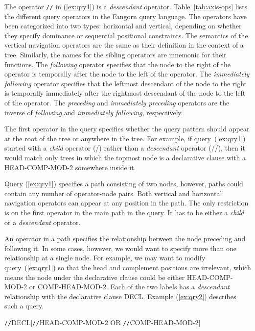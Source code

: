 The operator \verb=//= in (\ref{ex:qry1}) is a \emph{descendant} operator. Table~\ref{tab:axis-ops} 
lists the different query operators in the Fangorn query language.
The operators have been categorized
into two types: horizontal and vertical, depending on whether they
specify dominance or sequential positional constraints. The semantics
of the vertical navigation operators are the same as their definition
in the context of a tree. Similarly, the names for the sibling operators 
are mnemonic for their functions. The
\emph{following} operator specifies that the node to the right of the
operator is temporally after the node to the left of the operator. The
\emph{immediately following} operator specifies that the leftmost descendant of
the node to the right is temporally immediately after the rightmost
descendant of the node to the left of the operator. The \emph{preceding} and
\emph{immediately preceding} operators are the inverse of \emph{following} and \emph{immediately
following}, respectively.

The first operator in the query specifies whether the query pattern
should appear at the root of the tree or anywhere in the tree. 
For example, if query~(\ref{ex:qry1}) started with a {\it child} operator (/) rather than a {\it descendant} operator (//), then it would match only trees in which the topmost node is a declarative clause with a HEAD-COMP-MOD-2 somewhere inside it.


Query (\ref{ex:qry1}) specifies a path consisting of two nodes,
however, paths could contain any number of operator-node pairs. Both
vertical and horizontal navigation operators can appear at any
position in the path. The only restriction is on the first operator in
the main path in the query. It has to be either a \emph{child} or a
\emph{descendant} operator.

An operator in a path specifies the relationship between the node
preceding and following it. In some cases, however, we would want to
specify more than one relationship at a single node. For example, 
we may want to modify query~(\ref{ex:qry1}) so that the head and 
complement positions are irrelevant, which means the node under the
declarative clause could be either {\small HEAD-COMP-MOD-2} or 
COMP-HEAD-MOD-2. Each of the two labels has a \emph{descendant}
relationship with the declarative clause {\small DECL}. Example (\ref{ex:qry2})
describes such a query.

\begin{exe}
\ex\label{ex:qry2}\small
\verb=//=DECL[\verb=//=HEAD-COMP-MOD-2 OR \verb=//=COMP-HEAD-MOD-2]
\end{exe}


